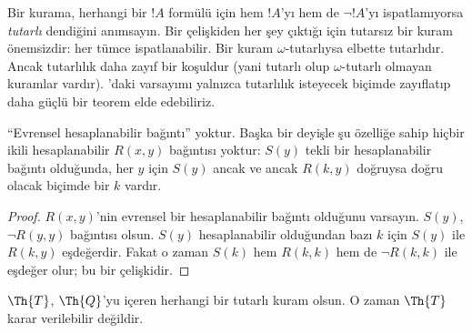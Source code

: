 \documentclass[../../../include/open-logic-section]{subfiles}
\begin{document}


\begin{explain}
Bir kurama, herhangi bir $!A$ formülü için hem $!A$'yı hem de
$\lnot !A$'yı ispatlamıyorsa \emph{tutarlı} dendiğini anımsayın. Bir
çelişkiden her şey çıktığı için tutarsız bir kuram önemsizdir: her tümce
ispatlanabilir. Bir kuram $\omega$-tutarlıysa elbette tutarlıdır. Ancak
tutarlılık daha zayıf bir koşuldur (yani tutarlı olup $\omega$-tutarlı
olmayan kuramlar vardır). 'daki varsayımı yalnızca
tutarlılık isteyecek biçimde zayıflatıp daha güçlü bir teorem elde
edebiliriz.
\end{explain}

\begin{lem}
“Evrensel hesaplanabilir bağıntı” yoktur. Başka bir deyişle şu özelliğe
sahip hiçbir ikili hesaplanabilir $R(x,y)$ bağıntısı yoktur: $S(y)$ tekli
bir hesaplanabilir bağıntı olduğunda, her $y$ için $S(y)$ ancak ve ancak
$R(k,y)$ doğruysa doğru olacak biçimde bir $k$ vardır.
\end{lem}

\begin{proof}
$R(x,y)$'nin evrensel bir hesaplanabilir bağıntı olduğunu varsayın. $S(y)$,
$\lnot R(y,y)$ bağıntısı olsun. $S(y)$ hesaplanabilir olduğundan bazı $k$
için $S(y)$ ile $R(k,y)$ eşdeğerdir. Fakat o zaman $S(k)$ hem $R(k,k)$ hem
de $\lnot R(k,k)$ ile eşdeğer olur; bu bir çelişkidir.
\end{proof}


\begin{thm}
$\Th{T}$, $\Th{Q}$'yu içeren herhangi bir tutarlı kuram olsun. O zaman
$\Th{T}$ karar verilebilir değildir.
\end{thm}
\end{document}
